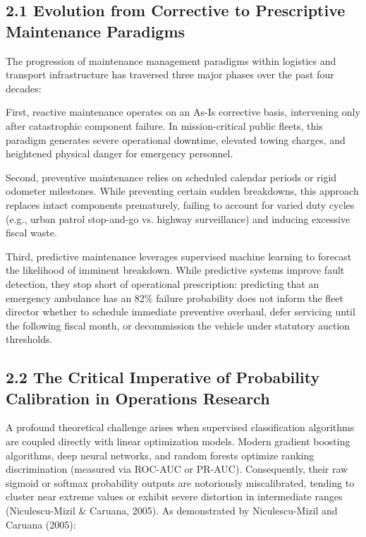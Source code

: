 \documentclass[10pt,a4paper,journal]{article}
\begin{document}
\subsection{2.1 Evolution from Corrective to Prescriptive Maintenance Paradigms}
The progression of maintenance management paradigms within logistics and transport infrastructure has traversed three major phases over the past four decades:

First, reactive maintenance operates on an As-Is corrective basis, intervening only after catastrophic component failure. In mission-critical public fleets, this paradigm generates severe operational downtime, elevated towing charges, and heightened physical danger for emergency personnel.

Second, preventive maintenance relies on scheduled calendar periods or rigid odometer milestones. While preventing certain sudden breakdowns, this approach replaces intact components prematurely, failing to account for varied duty cycles (e.g., urban patrol stop-and-go vs. highway surveillance) and inducing excessive fiscal waste.

Third, predictive maintenance leverages supervised machine learning to forecast the likelihood of imminent breakdown. While predictive systems improve fault detection, they stop short of operational prescription: predicting that an emergency ambulance has an 82\% failure probability does not inform the fleet director whether to schedule immediate preventive overhaul, defer servicing until the following fiscal month, or decommission the vehicle under statutory auction thresholds.

\subsection{2.2 The Critical Imperative of Probability Calibration in Operations Research}
A profound theoretical challenge arises when supervised classification algorithms are coupled directly with linear optimization models. Modern gradient boosting algorithms, deep neural networks, and random forests optimize ranking discrimination (measured via ROC-AUC or PR-AUC). Consequently, their raw sigmoid or softmax probability outputs are notoriously miscalibrated, tending to cluster near extreme values or exhibit severe distortion in intermediate ranges (Niculescu-Mizil \& Caruana, 2005). As demonstrated by Niculescu-Mizil and Caruana (2005):
\end{document}
